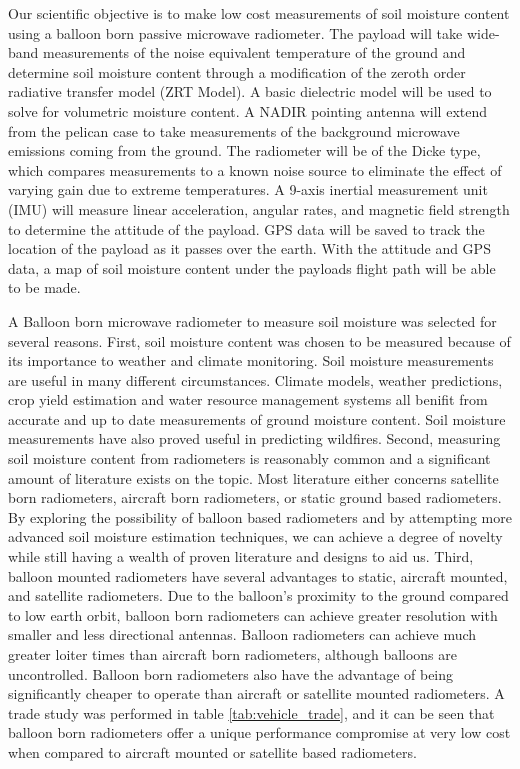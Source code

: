 \documentclass[12pt]{article}
\begin{document}
Our scientific objective is to make low cost measurements of soil moisture content using a balloon born passive microwave radiometer. The payload will take wide-band measurements of the noise equivalent temperature of the ground and determine soil moisture content through a modification of the zeroth order radiative transfer model (ZRT Model). A basic dielectric model will be used to solve for volumetric moisture content. \cite{ulaby_fung_moore_1986} A NADIR pointing antenna will extend from the pelican case to take measurements of the background microwave emissions coming from the ground. The radiometer will be of the Dicke type, which compares measurements to a known noise source to eliminate the effect of varying gain due to extreme temperatures. A 9-axis inertial measurement unit (IMU) will measure linear acceleration, angular rates, and magnetic field strength to determine the attitude of the payload. GPS data will be saved to track the location of the payload as it passes over the earth. With the attitude and GPS data, a map of soil moisture content under the payloads flight path will be able to be made. 

A Balloon born microwave radiometer to measure soil moisture was selected for several reasons. First, soil moisture content was chosen to be measured because of its importance to weather and climate monitoring.\cite{Pan2001} Soil moisture measurements are useful in many different circumstances. Climate models, weather predictions, crop yield estimation and water resource management systems all benifit from accurate and up to date measurements of ground moisture content. Soil moisture measurements have also proved useful in predicting wildfires.\cite{chaparro_piles_vall-llossera_2016,krueger_ochsner_quiring_engle_carlson_twidwell_fuhlendorf_2017} Second, measuring soil moisture content from radiometers is reasonably common and a significant amount of literature exists on the topic. Most literature either concerns satellite born radiometers, aircraft born radiometers, or static ground based radiometers. \cite{Hanington,Kerr2001,ulaby_fung_moore_1986,Friesen2008,Schmugge1994} By exploring the possibility of balloon based radiometers and by attempting more advanced soil moisture estimation techniques, we can achieve a degree of novelty while still having a wealth of proven literature and designs to aid us. Third, balloon mounted radiometers have several advantages to static, aircraft mounted, and satellite radiometers. Due to the balloon's proximity to the ground compared to low earth orbit, balloon born radiometers can achieve greater resolution with smaller and less directional antennas. Balloon radiometers can achieve much greater loiter times than aircraft born radiometers, although balloons are uncontrolled. Balloon born radiometers also have the advantage of being significantly cheaper to operate than aircraft or satellite mounted radiometers. A trade study was performed in table \ref{tab:vehicle_trade}, and it can be seen that balloon born radiometers offer a unique performance compromise at very low cost when compared to aircraft mounted or satellite based radiometers.
\end{document}
